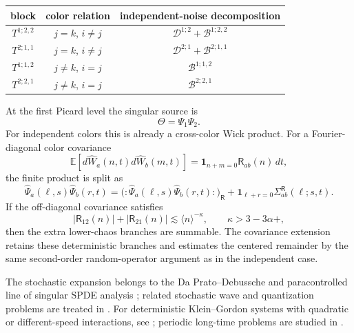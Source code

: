\documentclass[10pt]{amsart}
\numberwithin{equation}{section}
\theoremstyle{plain}
\theoremstyle{definition}
\theoremstyle{remark}
\newcommand{\E}{\mathbb{E}}
\begin{document}
\begin{center}
\small
\begin{tabular}{@{}ccc@{}}
\toprule
block & color relation & independent-noise decomposition \\
\midrule
$T^{1;2,2}$ & $j=k$, $i\ne j$ & $\mathcal D^{1;2}+\mathcal B^{1;2,2}$ \\
$T^{2;1,1}$ & $j=k$, $i\ne j$ & $\mathcal D^{2;1}+\mathcal B^{2;1,1}$ \\
$T^{1;1,2}$ & $j\ne k$, $i=j$ & $\mathcal B^{1;1,2}$ \\
$T^{2;2,1}$ & $j\ne k$, $i=j$ & $\mathcal B^{2;2,1}$ \\
\bottomrule
\end{tabular}
\end{center}

At the first Picard level the singular source is
\[
        \Theta=\Psi_1\Psi_2.
\]
For independent colors this is already a cross-color Wick product.  For a Fourier-diagonal color covariance
\[
        \E[d\widehat W_a(n,t)d\widehat W_b(m,t)]
        =\mathbf 1_{n+m=0}\mathsf R_{ab}(n)\,dt,
\]
the finite product is split as
\begin{equation}\label{eq:intro-correlated-color-split}
        \widehat\Psi_a(\ell,s)\widehat\Psi_b(r,t)
        =\bigl(:\widehat\Psi_a(\ell,s)\widehat\Psi_b(r,t):\bigr)_{\mathsf R}
        +\mathbf 1_{\ell+r=0}\Sigma_{ab}^{\mathsf R}(\ell;s,t).
\end{equation}
If the off-diagonal covariance satisfies
\[
        |\mathsf R_{12}(n)|+|\mathsf R_{21}(n)|
        \lesssim \langle n\rangle^{-\kappa},
        \qquad \kappa>3-3\alpha+,
\]
then the extra lower-chaos branches are summable.  The covariance extension retains these deterministic branches and estimates the centered remainder by the same second-order random-operator argument as in the independent case.

The stochastic expansion belongs to the Da Prato--Debussche and paracontrolled line of singular SPDE analysis \cite{DPD,Hairer,Paracontrolled,GKO}; related stochastic wave and quantization problems are treated in \cite{GKOT,OhOkamotoTolomeo,OhOkamoto,OhRobertTzvetkov}.  For deterministic Klein--Gordon systems with quadratic or different-speed interactions, see \cite{Shatah,SimonTaflin,Germain,IonescuPausader,Deng}; periodic long-time problems are studied in \cite{DelortSzeftel,FangZhang}.
\end{document}
